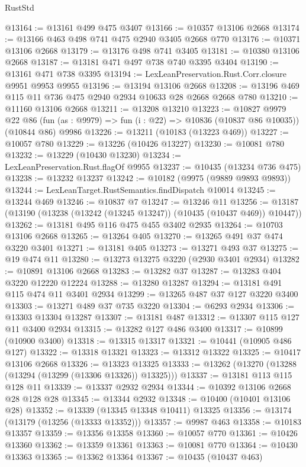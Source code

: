 \begin{lexlean}{RustStd}
\begin{coremodule}
@13164 := @13161 @499 @475 @3407
@13166 := @10357 @13106 @2668
@13174 := @13166 @463 @498 @741 @475 @2940 @3405 @2668 @770
@13176 := @10371 @13106 @2668
@13179 := @13176 @498 @741 @3405
@13181 := @10380 @13106 @2668
@13187 := @13181 @471 @497 @738 @740 @3395 @3404
@13190 := @13161 @471 @738 @3395
@13194 := LexLeanPreservation.Rust.Corr.closure @9951 @9953 @9955
@13196 := @13194 @13106 @2668
@13208 := @13196 @469 @115 @11 @736 @475 @2940 @2934 @10633 @28 @2668 @2668 @780
@13210 := @11160 @13106 @2668
@13211 := @13208 @13210
@13223 := @10827
    @9979
    @22
    @86
    (fun (as : @9979) => fun (i : @22) => @10836 (@10837 @86 @10035))
    (@10844 @86)
    @9986
@13226 := @13211 (@10183 (@13223 @469))
@13227 := @10057 @780
@13229 := @13226 (@10426 @13227)
@13230 := @10081 @780
@13232 := @13229 (@10430 @13230)
@13234 := LexLeanPreservation.Rust.flagOf @9955
@13237 := @10435 (@13234 @736 @475)
@13238 := @13232 @13237
@13242 := @10182 (@9975 (@9889 @9893 @9893))
@13244 := LexLeanTarget.RustSemantics.findDispatch @10014
@13245 := @13244 @469
@13246 := @10837 @7
@13247 := @13246 @11
@13256 := @13187 (@13190 (@13238 (@13242 (@13245 @13247)) (@10435 (@10437 @469)) @10447))
@13262 := @13181 @495 @116 @475 @455 @3402 @2935
@13264 := @10703 @13106 @2668
@13265 := @13264 @405
@13270 := @13265 @491 @37 @474 @3220 @3401
@13271 := @13181 @405
@13273 := @13271 @493 @37
@13275 := @19 @474 @11
@13280 := @13273 @13275 @3220 (@2930 @3401 @2934)
@13282 := @10891 @13106 @2668
@13283 := @13282 @37
@13287 := @13283 @404 @3220 @12220 @12224
@13288 := @13280 @13287
@13294 := @13181 @491 @115 @474 @11 @3401 @2934
@13299 := @13265 @487 @37 @127 @3220 @3400
@13303 := @13271 @489 @37 @735 @3220
@13304 := @6293 @2934
@13306 := @13303 @13304 @13287
@13307 := @13181 @487
@13312 := @13307 @115 @127 @11 @3400 @2934
@13315 := @13282 @127 @486 @3400
@13317 := @10899 (@10900 @3400)
@13318 := @13315 @13317
@13321 := @10441 (@10905 @486 @127)
@13322 := @13318 @13321
@13323 := @13312 @13322
@13325 := @10417 @13106 @2668
@13326 := @13323 @13325
@13333 := @13262 (@13270 (@13288 (@13294 (@13299 (@13306 @13326)) @13325)))
@13337 := @13181 @113 @115 @128 @11
@13339 := @13337 @2932 @2934
@13344 := @10392 @13106 @2668 @28 @128 @28
@13345 := @13344 @2932
@13348 := @10400 (@10401 @13106 @28)
@13352 := @13339 (@13345 @13348 @10411) @13325
@13356 := @13174 (@13179 (@13256 (@13333 @13352)))
@13357 := @9987 @463
@13358 := @10183 @13357
@13359 := @13356 @13358
@13360 := @10057 @770
@13361 := @10426 @13360
@13362 := @13359 @13361
@13363 := @10081 @770
@13364 := @10430 @13363
@13365 := @13362 @13364
@13367 := @10435 (@10437 @463)

\end{coremodule}
\end{lexlean}

